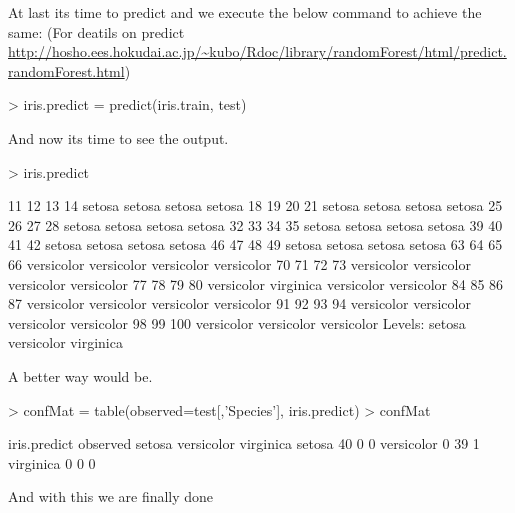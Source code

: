 \documentclass[journal]{IEEEtran}
\begin{document}
At last its time to predict and we execute the below command to achieve the same: (For deatils on predict \url{http://hosho.ees.hokudai.ac.jp/~kubo/Rdoc/library/randomForest/html/predict.randomForest.html})\\
\begin{Schunk}
\begin{Sinput}
> iris.predict = predict(iris.train, test)
\end{Sinput}
\end{Schunk}
And now its time to see the output.
\begin{Schunk}
\begin{Sinput}
> iris.predict
\end{Sinput}
\begin{Soutput}
        11         12         13         14         
    setosa     setosa     setosa     setosa     
        18         19         20         21         
    setosa     setosa     setosa     setosa     
        25         26         27         28         
    setosa     setosa     setosa     setosa     
        32         33         34         35         
    setosa     setosa     setosa     setosa     
        39         40         41         42         
    setosa     setosa     setosa     setosa     
        46         47         48         49         
    setosa     setosa     setosa     setosa     
        63         64         65         66         
versicolor versicolor versicolor versicolor 
        70         71         72         73         
versicolor versicolor versicolor versicolor 
        77         78         79         80         
versicolor  virginica versicolor versicolor 
        84         85         86         87         
versicolor versicolor versicolor versicolor 
        91         92         93         94         
versicolor versicolor versicolor versicolor 
        98         99        100 
versicolor versicolor versicolor 
Levels: setosa versicolor virginica
\end{Soutput}
\end{Schunk}
A better way would be.
\begin{Schunk}
\begin{Sinput}
> confMat = table(observed=test[,'Species'], 
iris.predict)
> confMat
\end{Sinput}
\begin{Soutput}
            iris.predict
observed     setosa versicolor virginica
  setosa         40          0         0
  versicolor      0         39         1
  virginica       0          0         0
\end{Soutput}
\end{Schunk}
And with this we are finally done
\end{document}
